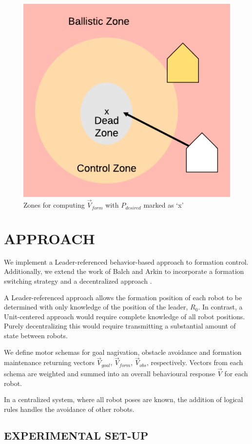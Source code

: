 \documentclass[letterpaper, 10 pt, conference]{ieeeconf}  %
\begin{document}
\begin{figure}[ht]
\centering
\includegraphics[width=0.45\linewidth]{images/formation_zones.png}
\caption{Zones for computing $\vec{V}_{form}$ with $P_{desired}$ marked as `x'}
\label{formation_zones}
\end{figure}


\section{APPROACH}
We implement a Leader-referenced behavior-based approach to formation control. Additionally, we extend the work of Balch and Arkin to incorporate a formation switching strategy and a decentralized approach \cite{repository}.

A Leader-referenced approach allows the formation position of each robot to be determined with only knowledge of the position of the leader, $R_0$. 
In contrast, a Unit-centered approach would require complete knowledge of all robot positions. Purely decentralizing this would require transmitting a substantial amount of state between robots. %

We define motor schemas for goal nagivation, obstacle avoidance and formation maintenance returning vectors $\vec{V}_{goal}$, $\vec{V}_{form}$, $\vec{V}_{obs}$, respectively. Vectors from each schema are weighted and summed into an overall behavioural response $\vec{V}$ for each robot.

In a centralized system, where all robot poses are known, the addition of logical rules handles the avoidance of other robots.

\subsection{EXPERIMENTAL SET-UP}
\end{document}
